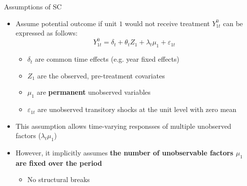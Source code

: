 \documentclass[hyperref={pdfpagelabels=false}]{beamer}
\begin{document}
%		




\begin{frame}{Assumptions of SC}
	\begin{itemize}
		\item Assume potential outcome if unit $1$ would not receive treatment $Y^0_{1t}$ can be expressed as follows:
		\begin{equation*}
			Y^0_{1t}=\delta_t+\theta_tZ_1+\lambda_t\mu_1+\varepsilon_{1t}
\end{equation*}
		\begin{itemize}
			\item $\delta_t$ are common time effects (e.g. year fixed effects)
			\vspace{0.2cm}
			\item $Z_1$ are the observed, pre-treatment covariates
			\vspace{0.2cm}
			\item $\mu_1$ are \textbf{permanent} unobserved variables
			\vspace{0.2cm}
			\item $\varepsilon_{1t}$ are unobserved transitory shocks at the unit level with zero mean
			\vspace{0.2cm}
		\end{itemize}
		\item This assumption allows time-varying responsses of multiple unobserved factors ($\lambda_t\mu_1$) 
		
		\vspace{0.2cm}
		\item However, it implicitly assumes \textbf{the number of unobservable factors $\mu_1$ are fixed over the period} 
		\vspace{0.2cm}
		\begin{itemize}
			\item No structural breaks
		\end{itemize}
		
		
	\end{itemize}
\end{frame}
\end{document}

